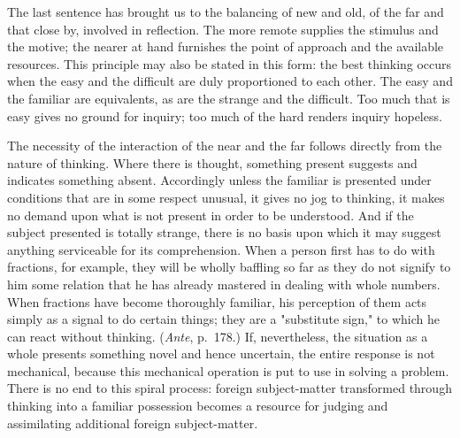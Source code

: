 \documentclass[showtrims,ustradepaper]{memoir}
\begin{document}
The last sentence has brought us to the balancing of new and old, of the
far and that close by, involved in reflection. The more remote supplies
the stimulus and the motive; the nearer at hand furnishes the point of
approach and the available resources. This principle may also be stated
in this form: the best thinking occurs when the easy and the difficult
are duly proportioned to each other. The easy and the familiar are
equivalents, as are the strange and the difficult. Too much that is easy
gives no ground for inquiry; too much of the hard renders inquiry
hopeless.


The necessity of the interaction of the near and the far follows
directly from the nature of thinking. Where there is thought, something
present suggests and indicates something absent. Accordingly unless the
familiar
is presented under conditions that are in some respect unusual, it gives
no jog to thinking, it makes no demand upon what is not present in order
to be understood. And if the subject presented is totally strange, there
is no basis upon which it may suggest anything serviceable for its
comprehension. When a person first has to do with fractions, for
example, they will be wholly baffling so far as they do not signify to
him some relation that he has already mastered in dealing with whole
numbers. When fractions have become thoroughly familiar, his perception
of them acts simply as a signal to do certain things; they are a
"substitute sign," to which he can react without thinking. (\emph{Ante},
p.\ 178.) If, nevertheless, the situation as a whole presents something
novel and hence uncertain, the entire response is not mechanical,
because this mechanical operation is put to use in solving a problem.
There is no end to this spiral process: foreign subject-matter
transformed through thinking into a familiar possession becomes a
resource for judging and assimilating additional foreign subject-matter.

\end{document}
